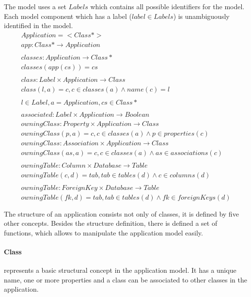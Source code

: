 \documentclass[11pt]{article}
\begin{document}
The model uses a set $Labels$ which contains all possible identifiers for the model. Each model component which has a label ($label \in Labels$) is unambiguously identified in the model.
\begin{gather*}
  Application = < Class* >
  \\ 
  app : Class* \rightarrow  Application \\ \\
  classes : Application \rightarrow Class* \\
  classes(app(cs)) = cs  \\\\
  class : Label \times Application \rightarrow Class   \\ 
  class(l, a) = c, c \in classes(a) \wedge name(c) = l \\ \\
  l \in Label, a = Application, cs \in Class* 
  \\ \\
  associated :  Label \times Application \rightarrow Boolean \\
  owningClass : Property \times Application \rightarrow Class  \\ owningClass(p, a) = c, c \in classes(a) \wedge p \in properties(c) \\
  owningClass : Association \times Application \rightarrow Class  \\
owningClass(as, a) = c, c \in classes(a) \wedge as \in associations(c) \\ \\
owningTable : Column \times Database \rightarrow Table  \\
owningTable(c, d) = tab, tab \in tables(d) \wedge c \in columns(d) \\ \\
owningTable : ForeignKey \times Database \rightarrow Table  \\
owningTable(fk, d) = tab, tab \in tables(d) \wedge fk \in foreignKeys(d)\\ \\ 
\end{gather*}
The structure of an application consists not only of classes, it is defined by five other concepts. Besides the structure definition, there is defined a set of functions, which allows to manipulate the application model easily. 

\paragraph{Class} represents a basic structural concept in the application model. It has a unique name, one or more properties and a class can be associated to other classes in the application. 
\end{document}
